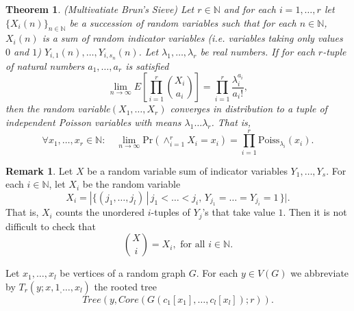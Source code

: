 \documentclass[11pt,notitlepage,a4paper]{article}
\newtheorem{theorem}{Theorem}[section]
\theoremstyle{definition}
\newtheorem{remark}{Remark}[section]
\newcommand{\N}{\mathbb{N}}
\newcommand{\Ln}{\lim\limits_{n\to \infty}}
\begin{document}
\begin{theorem}{(Multivatiate Brun's Sieve)}
	Let $r\in \N$ and for each $i=1,\dots, r$  let
	$\{X_i(n)\}_{n\in \N}$ be a succession of random variables 
	such that for each $n\in \N$, $X_i(n)$ 
	is a sum of random indicator variables (i.e. variables 
	taking only values $0$ and $1$)
	$Y_{i,1}(n),\dots, Y_{i,s_n}(n)$. Let $\lambda_1, \dots ,
	\lambda_r$ be real numbers. If for each 
	$r$-tuple of natural numbers $a_1,\dots, a_r$
	is satisfied
	\[ \Ln E\left[\prod_{i=1}^r \binom{X_i}{a_i} \right] = 
	\prod_{i=1}^r \frac{\lambda_i^{a_i}}{a_i!}, \]
	then the random variable$(X_1,\dots ,X_r)$ converges in distribution
	to a tuple of independent Poisson variables with means $\lambda_1
	\dots \lambda_r$. That is,	
	\[ \forall x_1,\dots, x_r\in \N: \quad \Ln \mathrm{Pr}(\wedge_{i=1}^r
	 X_i=x_i)= \prod_{i=1}^r \mathrm{Poiss}_{\lambda_i}(x_i).\]

\end{theorem}

\begin{remark}
	Let $X$ be a random variable sum of indicator variables
	$Y_1, \dots, Y_s$. For each $i\in \N$, let 
	$X_i$ be the random variable
	\[X_i= |\{ (j_1,\dots, j_l)\, | \, j_1<\dots<j_i, \, Y_{j_1}=
	\dots = Y_{j_i}=1 \, \}|.\]
	That is, $X_i$ counts the unordered $i$-tuples of $Y_j$'s that 
	take value $1$. Then it is not difficult to check that
	\[ \binom{X}{i}= X_i, \text{ for all } i\in \N. \] 
\end{remark}

Let $x_1, \dots, x_l$ be vertices of a random graph $G$.
For each $y\in V(G)$ we abbreviate by $T_r(y; x,1_,\dots, x_l)$
the rooted tree 
\[Tree(y, Core(G(c_1[x_1],\dots, c_l[x_l]);r)).\]
\end{document}
